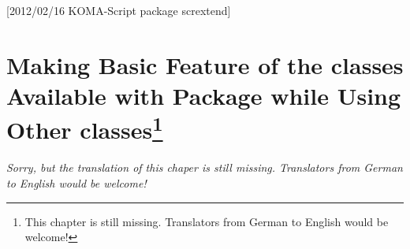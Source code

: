 %
%
%
%
%
%
%
%
% 
%
%
%
%

[2012/02/16 KOMA-Script package scrextend]


\chapter{Making Basic Feature of the
  \KOMAScript{} classes
  Available with Package  
  while Using Other classes\protect\footnote{This chapter is still
    missing. Translators from German to English would be welcome!}}
%

\emph{Sorry, but the translation of this chaper is still missing. Translators
  from German to English would be welcome!}

%
%

\endinput


